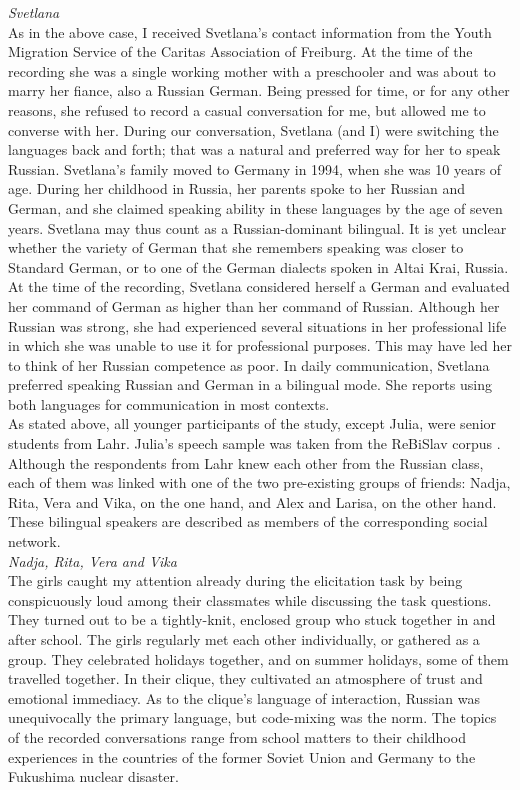 \noindent \textit{Svetlana}\\
As in the above case, I received Svetlana's contact information from the Youth Migration Service of the Caritas Association of Freiburg. At the time of the recording she was a single working mother with a preschooler and was about to marry her fiance, also a Russian German. Being pressed for time, or for any other reasons, she refused to record a casual conversation for me, but allowed me to converse with her. During our conversation, Svetlana (and I) were switching the languages back and forth; that was a natural and preferred way for her to speak Russian. Svetlana's family moved to Germany in 1994, when she was 10 years of age. During her childhood in Russia, her parents spoke to her Russian and German, and she claimed speaking ability in these languages by the age of seven years. Svetlana may thus count as a Russian-dominant bilingual. It is yet unclear whether the variety of German that she remembers speaking was closer to Standard German, or to one of the German dialects spoken in Altai Krai, Russia. At the time of the recording, Svetlana considered herself a German and evaluated her command of German as higher than her command of Russian. Although her Russian was strong, she had experienced several situations in her professional life in which she was unable to use it for professional purposes. This may have led her to think of her Russian competence as poor. In daily communication, Svetlana preferred speaking Russian and German in a bilingual mode. She reports using both languages for communication in most contexts.\\

As stated above, all younger participants of the study, except Julia, were senior students from Lahr. Julia's speech sample was taken from the ReBiSlav corpus \citep[cf.][]{rebislav}. Although the respondents from Lahr knew each other from the Russian class, each of them was linked with one of the two pre-existing groups of friends: Nadja, Rita, Vera and Vika, on the one hand, and Alex and Larisa, on the other hand. These bilingual speakers are described as members of the corresponding social network.\\

\noindent \textit{Nadja, Rita, Vera and Vika}\\
The girls caught my attention already during the elicitation task by being conspicuously loud among their classmates while discussing the task questions. They turned out to be a tightly-knit, enclosed group who stuck together in and after school. The girls regularly met each other individually, or gathered as a group. They celebrated holidays together, and on summer holidays, some of them travelled together. In their clique, they  cultivated an atmosphere of trust and emotional immediacy. As to the clique's language of interaction, Russian was unequivocally the primary language, but code-mixing was the norm. The topics of the recorded conversations range from school matters to their childhood experiences in the countries of the former Soviet Union and Germany to the Fukushima nuclear disaster. 

